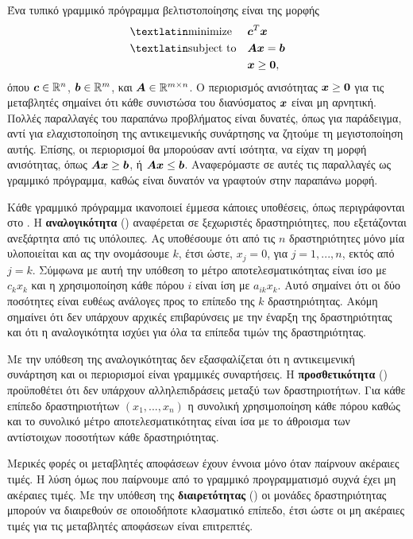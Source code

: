 Ένα τυπικό γραμμικό πρόγραμμα βελτιστοποίησης είναι της μορφής
\begin{equation}\label{eq:lp_min}
    \begin{aligned}
        & {\text{\tl{minimize}}}
        & & \vc{c}^T \vc{x} \\
        & \text{\tl{subject to}}
        & & \mt{A} \vc{x} = \vc{b} \\
        &&& \vc{x} \ge \vc{0},
    \end{aligned}
\end{equation}
όπου $\bm{c} \in \mathbb{R}^n$, $\bm{b} \in \mathbb{R}^m$, και
$\boldsymbol{A} \in \mathbb{R}^{m \times n}$. Ο περιορισμός ανισότητας $\bm{x} \ge \bm{0}$
για τις μεταβλητές σημαίνει ότι κάθε συνιστώσα του διανύσματος $\bm{x}$
είναι μη αρνητική. Πολλές παραλλαγές του παραπάνω προβλήματος είναι δυνατές,
όπως για παράδειγμα, αντί για ελαχιστοποίηση της αντικειμενικής συνάρτησης να ζητούμε
τη μεγιστοποίηση αυτής. Επίσης, οι περιορισμοί θα μπορούσαν αντί ισότητα, να είχαν
τη μορφή ανισότητας, όπως $\boldsymbol{A}\bm{x} \ge \bm{b}$, ή $\boldsymbol{A}\bm{x} \le \bm{b}$.
Αναφερόμαστε σε αυτές τις παραλλαγές ως γραμμικό πρόγραμμα, καθώς είναι δυνατόν να γραφτούν στην παραπάνω μορφή.

Κάθε γραμμικό πρόγραμμα ικανοποιεί έμμεσα κάποιες υποθέσεις, όπως περιγράφονται
στο \cite{hillier1985}. Η \textbf{αναλογικότητα} () αναφέρεται σε
ξεχωριστές δραστηριότητες, που εξετάζονται ανεξάρτητα από τις υπόλοιπες.
Ας υποθέσουμε ότι από τις $n$ δραστηριότητες μόνο μία υλοποιείται και
ας την ονομάσουμε $k$,  έτσι ώστε, $x_j = 0$, για $j = 1, ..., n$, εκτός
από $j = k$. Σύμφωνα με αυτή την υπόθεση το μέτρο αποτελεσματικότητας
είναι ίσο με $c_k x_k$ και η χρησιμοποίηση κάθε πόρου $i$ είναι ίση
με $a_{ik}x_k$. Αυτό σημαίνει ότι οι δύο ποσότητες είναι ευθέως ανάλογες
προς το επίπεδο της $k$ δραστηριότητας. Ακόμη σημαίνει ότι δεν υπάρχουν
αρχικές επιβαρύνσεις με την έναρξη της δραστηριότητας και ότι η αναλογικότητα
ισχύει για όλα τα επίπεδα τιμών της δραστηριότητας.

Με την υπόθεση της αναλογικότητας δεν εξασφαλίζεται ότι η αντικειμενική συνάρτηση
και οι περιορισμοί είναι γραμμικές συναρτήσεις. Η \textbf{προσθετικότητα}
() προϋποθέτει ότι δεν υπάρχουν αλληλεπιδράσεις μεταξύ των
δραστηριοτήτων. Για κάθε επίπεδο δραστηριοτήτων $(x_1,..., x_n)$ η
συνολική χρησιμοποίηση κάθε πόρου καθώς και το συνολικό μέτρο αποτελεσματικότητας
είναι ίσα με το άθροισμα των αντίστοιχων ποσοτήτων κάθε δραστηριότητας.

Μερικές φορές οι μεταβλητές αποφάσεων έχουν έννοια μόνο όταν παίρνουν
ακέραιες τιμές. Η λύση όμως που παίρνουμε από το γραμμικό προγραμματισμό
συχνά έχει μη ακέραιες τιμές. Με την υπόθεση της \textbf{διαιρετότητας}
() οι μονάδες δραστηριότητας μπορούν να διαιρεθούν σε
οποιοδήποτε κλασματικό επίπεδο, έτσι ώστε οι μη ακέραιες τιμές για τις μεταβλητές
αποφάσεων είναι επιτρεπτές.

